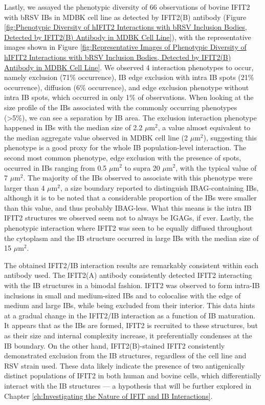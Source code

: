 Lastly, we assayed the phenotypic diversity of 66 observations of bovine IFIT2 with bRSV IBs in MDBK cell line as detected by IFIT2(B) antibody (Figure \ref{fig:Phenotypic Diversity of hIFIT2 Interactions with bRSV Inclusion Bodies, Detected by IFIT2(B) Antibody in MDBK Cell Line}), with the representative images shown in Figure \ref{fig:Representative Images of Phenotypic Diversity of hIFIT2 Interactions with bRSV Inclusion Bodies, Detected by IFIT2(B) Antibody in MDBK Cell Line}. We observed 4 interaction phenotypes to occur, namely exclusion (71\% occurrence), IB edge exclusion with intra IB spots (21\% occurrence), diffusion (6\% occurrence), and edge exclusion phenotype without intra IB spots, which occurred in only 1\% of observations. When looking at the size profile of the IBs associated with the commonly occurring phenotypes (>5\%), we can see a separation by IB area. The exclusion interaction phenotype happened in IBs with the median size of 2.2 \(\mu \mbox{m}^2\), a value almost equivalent to the median aggregate value observed in MDBK cell line (2 \(\mu \mbox{m}^2\)), suggesting this phenotype is a good proxy for the whole IB population-level interaction. The second most common phenotype, edge exclusion with the presence of spots, occurred in IBs ranging from 0.5 \(\mu \mbox{m}^2\) to supra 20 \(\mu \mbox{m}^2\), with the typical value of 7 \(\mu \mbox{m}^2\). The majority of the IBs observed to associate with this phenotype were larger than 4 \(\mu \mbox{m}^2\), a size boundary reported to distinguish IBAG-containing IBs, although it is to be noted that a considerable proportion of the IBs were smaller than this value, and thus probably IBAG-less. What this means is the intra IB IFIT2 structures we observed seem not to always be IGAGs, if ever. Lastly, the phenotypic interaction where IFIT2 was seen to be equally diffused throughout the cytoplasm and the IB structure occurred in large IBs with the median size of 15 \(\mu \mbox{m}^2\).

The obtained IFIT2/IB interaction results are remarkably consistent within each antibody used. The IFIT2(A) antibody consistently detected IFIT2 interacting with the IB structures in a bimodal fashion. IFIT2 was observed to form intra-IB inclusions in small and medium-sized IBs and to colocalise with the edge of medium and large IBs, while being excluded from their interior. This data hints at a gradual change in the IFIT2/IB interaction as a function of IB maturation. It appears that as the IBs are formed, IFIT2 is recruited to these structures, but as their size and internal complexity increase, it preferentially condenses at the IB boundary. On the other hand, IFIT2(B)-stained IFIT2 consistently demonstrated exclusion from the IB structures, regardless of the cell line and RSV strain used. These data likely indicate the presence of two antigenically distinct populations of IFIT2 in both human and bovine cells, which differentially interact with the IB structures — a hypothesis that will be further explored in Chapter \ref{ch:Investigating the Nature of IFIT and IB Interactions}.


